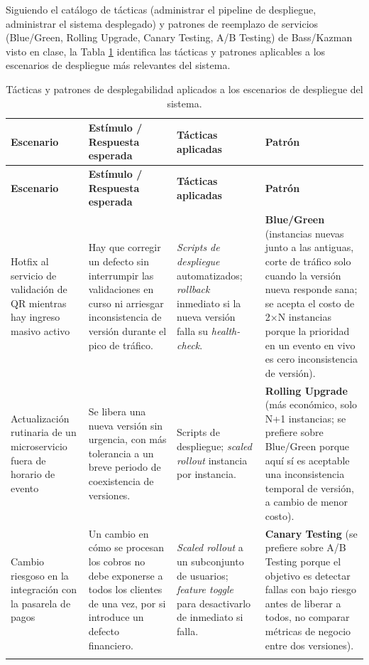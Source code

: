 \documentclass[12pt,a4paper]{article}
\begin{document}
Siguiendo el catálogo de tácticas (administrar el pipeline de despliegue, administrar el sistema
desplegado) y patrones de reemplazo de servicios (Blue/Green, Rolling Upgrade, Canary Testing,
A/B Testing) de Bass/Kazman visto en clase, la Tabla \ref{tab:tacticas-desplegabilidad} identifica
las tácticas y patrones aplicables a los escenarios de despliegue más relevantes del sistema.

\begin{center}
\begin{longtable}{p{2.6cm}p{4.7cm}p{3.6cm}p{2.9cm}}
\toprule
\textbf{Escenario} & \textbf{Estímulo / Respuesta esperada} & \textbf{Tácticas aplicadas} & \textbf{Patrón}\\
\midrule
\endfirsthead
\toprule
\textbf{Escenario} & \textbf{Estímulo / Respuesta esperada} & \textbf{Tácticas aplicadas} & \textbf{Patrón}\\
\midrule
\endhead
Hotfix al servicio de validación de QR mientras hay ingreso masivo activo &
Hay que corregir un defecto sin interrumpir las validaciones en curso ni arriesgar
inconsistencia de versión durante el pico de tráfico. &
\textit{Scripts de despliegue} automatizados; \textit{rollback} inmediato si la nueva versión
falla su \textit{health-check}. &
\textbf{Blue/Green} (instancias nuevas junto a las antiguas, corte de tráfico solo cuando la
versión nueva responde sana; se acepta el costo de 2×N instancias porque la prioridad en un
evento en vivo es cero inconsistencia de versión).\\[0.5em]

Actualización rutinaria de un microservicio fuera de horario de evento &
Se libera una nueva versión sin urgencia, con más tolerancia a un breve periodo de coexistencia
de versiones. &
Scripts de despliegue; \textit{scaled rollout} instancia por instancia. &
\textbf{Rolling Upgrade} (más económico, solo N+1 instancias; se prefiere sobre Blue/Green porque
aquí sí es aceptable una inconsistencia temporal de versión, a cambio de menor costo).\\[0.5em]

Cambio riesgoso en la integración con la pasarela de pagos &
Un cambio en cómo se procesan los cobros no debe exponerse a todos los clientes de una vez, por si
introduce un defecto financiero. &
\textit{Scaled rollout} a un subconjunto de usuarios; \textit{feature toggle} para desactivarlo de
inmediato si falla. &
\textbf{Canary Testing} (se prefiere sobre A/B Testing porque el objetivo es detectar fallas con
bajo riesgo antes de liberar a todos, no comparar métricas de negocio entre dos versiones).\\
\bottomrule
\caption{Tácticas y patrones de desplegabilidad aplicados a los escenarios de despliegue del
sistema.}
\label{tab:tacticas-desplegabilidad}
\end{longtable}
\end{center}
\end{document}
